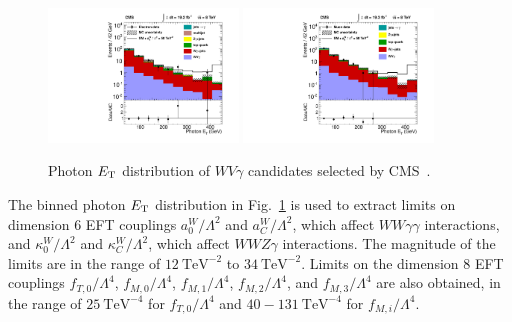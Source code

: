 \begin{figure}[p]
    \centering
    \includegraphics[width=0.45\textwidth]{figures/ss-inclboson-triboson-wvg-ele-cms8tev.pdf}
    \includegraphics[width=0.45\textwidth]{figures/ss-inclboson-triboson-wvg-mu-cms8tev.pdf}
    \caption{Photon $E_{\mathrm{T}}$ distribution of $WV\gamma$ candidates selected by CMS~\cite{Chatrchyan:2014bza}.}
    \label{fig:ss-inclboson-triboson-wvg-cms8tev}
\end{figure}

The binned photon $E_{\mathrm{T}}$ distribution in
Fig.~\ref{fig:ss-inclboson-triboson-wvg-cms8tev} is used to extract
limits on dimension 6 EFT couplings $a^W_0/\Lambda^2$ and
$a^W_C/\Lambda^2$, which affect $WW\gamma\gamma$ interactions, and
$\kappa^W_0/\Lambda^2$ and $\kappa^W_C/\Lambda^2$, which affect
$WWZ\gamma$ interactions.  The magnitude of the limits are in the
range of $12\ \textrm{TeV}^{-2}$ to $34\ \textrm{TeV}^{-2}$.  Limits
on the dimension 8 EFT couplings $f_{T,0}/\Lambda^4$,
$f_{M,0}/\Lambda^4$, $f_{M,1}/\Lambda^4$, $f_{M,2}/\Lambda^4$, and
$f_{M,3}/\Lambda^4$ are also obtained, in the range of
$25\ \textrm{TeV}^{-4}$ for $f_{T,0}/\Lambda^4$ and
$40-131\ \textrm{TeV}^{-4}$ for $f_{M,i}/\Lambda^4$.  
